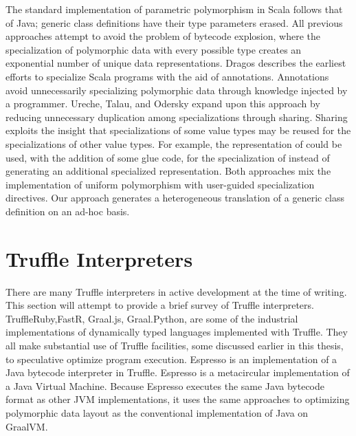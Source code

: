 The standard implementation of parametric polymorphism in Scala follows that of Java; generic class definitions have their type parameters erased.
All previous approaches attempt to avoid the problem of bytecode explosion, where the specialization of polymorphic data with every possible type creates an exponential number of unique data representations.
Dragos describes the earliest efforts to specialize Scala programs with the aid of annotations\cite{scala:specialization}.
Annotations avoid unnecessarily specializing polymorphic data through knowledge injected by a programmer.
Ureche, Talau, and Odersky expand upon this approach by reducing unnecessary duplication among specializations through sharing\cite{scala:miniboxing}.
Sharing exploits the insight that specializations of some value types may be reused for the specializations of other value types.
For example, the representation of  could be used, with the addition of some glue code, for the specialization of  instead of generating an additional specialized representation. 
Both approaches mix the implementation of uniform polymorphism with user-guided specialization directives.
Our approach generates a heterogeneous translation of a generic class definition on an ad-hoc basis.

\section{Truffle Interpreters}

There are many Truffle interpreters in active development at the time of writing.
This section will attempt to provide a brief survey of Truffle interpreters.
TruffleRuby\cite{trufflyruby:specialization,truffleruby:object-model},FastR, Graal.js, Graal.Python,\cite{truffle:thesis} are some of the industrial implementations of dynamically typed languages implemented with Truffle.
They all make substantial use of Truffle facilities, some discussed earlier in this thesis, to speculative optimize program execution. 
Espresso\cite{graalvm:espresso} is an implementation of a Java bytecode interpreter in Truffle. 
Espresso is a metacircular implementation of a Java Virtual Machine.
Because Espresso executes the same Java bytecode format as other JVM implementations, it uses the same approaches to optimizing polymorphic data layout as the conventional implementation of Java on GraalVM.


